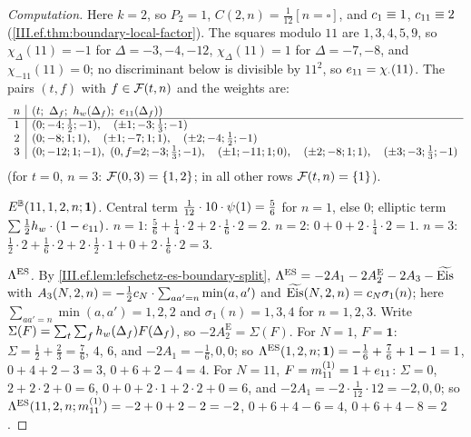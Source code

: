 \begin{example}[the golden values at $D=11$]
\end{example}
\begin{proof}[Computation]
Here $k=2$, so $P_2=1$, $C(2,n)=\frac1{12}[n=\square]$, and $c_1\equiv1$, $c_{11}\equiv2$ (\cref{III.ef.thm:boundary-local-factor}). The
squares modulo $11$ are $1,3,4,5,9$, so $\chi_\Delta(11)=-1$ for $\Delta=-3,-4,-12$, $\chi_\Delta(11)=1$ for $\Delta=-7,-8$, and $\chi_{-11}(11)=0$; no
discriminant below is divisible by $11^2$, so $e_{11}=\chi_\cdot(11)$. The pairs $(t,f)$ with $f\in\mathcal{F}(t,n)$ and the weights are:
\[
\begin{array}{c|l}
  n & (t;\ \Delta_f;\ \hw(\Delta_f);\ \esym_{11}(\Delta_f))\\\hline
  1 & (0;-4;\tfrac12;-1),\quad(\pm1;-3;\tfrac13;-1)\\
  2 & (0;-8;1;1),\quad(\pm1;-7;1;1),\quad(\pm2;-4;\tfrac12;-1)\\
  3 & (0;-12;1;-1),\ (0,f{=}2;-3;\tfrac13;-1),\quad(\pm1;-11;1;0),\quad(\pm2;-8;1;1),\quad(\pm3;-3;\tfrac13;-1)
\end{array}
\]
(for $t=0$, $n=3$: $\mathcal{F}(0,3)=\{1,2\}$; in all other rows $\mathcal{F}(t,n)=\{1\}$).

\emph{$E^{\mathbb{B}}(11,1,2,n;\mathbf 1)$.} Central term $\frac1{12}\cdot10\cdot\psi(1)=\frac56$ for $n=1$, else $0$; elliptic term
$\sum\frac12h_w\cdot(1-e_{11})$. $n=1$: $\frac56+\frac14\cdot2+2\cdot\frac16\cdot2=2$. $n=2$: $0+0+2\cdot\frac14\cdot2=1$. $n=3$:
$\frac12\cdot2+\frac16\cdot2+2\cdot\frac12\cdot1+0+2\cdot\frac16\cdot2=3$.

\emph{$\Lambda^{\mathrm{ES}}$.} By \cref{III.ef.lem:lefschetz-es-boundary-split}, $\Lambda^{\mathrm{ES}}=-2A_1-2A_2^{\mathrm E}-2A_3-\widetilde{\mathrm{Eis}}$ with $A_3(N,2,n)=-\frac12c_N\cdot\sum_{aa'=n}\min(a,a')$
and $\widetilde{\mathrm{Eis}}(N,2,n)=c_N\sigma_1(n)$; here $\sum_{aa'=n}\min(a,a')=1,2,2$ and $\sigma_1(n)=1,3,4$ for $n=1,2,3$. Write $\Sigma(F)=\sum_t\sum_fh_w(\Delta_f)F(\Delta_f)$, so
$-2A_2^{\mathrm E}=\Sigma(F)$.
For $N=1$, $F=\mathbf 1$: $\Sigma=\frac12+\frac23=\frac76$, $4$, $6$, and $-2A_1=-\frac16,0,0$; so $\Lambda^{\mathrm{ES}}(1,2,n;\mathbf 1)=-\frac16+\frac76+1-1=1$, $0+4+2-3=3$,
$0+6+2-4=4$.
For $N=11$, $F=m^{(1)}_{11}=1+e_{11}$: $\Sigma=0$, $2+2\cdot2+0=6$, $0+0+2\cdot1+2\cdot2+0=6$, and $-2A_1=-2\cdot\frac1{12}\cdot12=-2,0,0$; so
$\Lambda^{\mathrm{ES}}(11,2,n;m^{(1)}_{11})=-2+0+2-2=-2$, $0+6+4-6=4$, $0+6+4-8=2$.
\end{proof}
